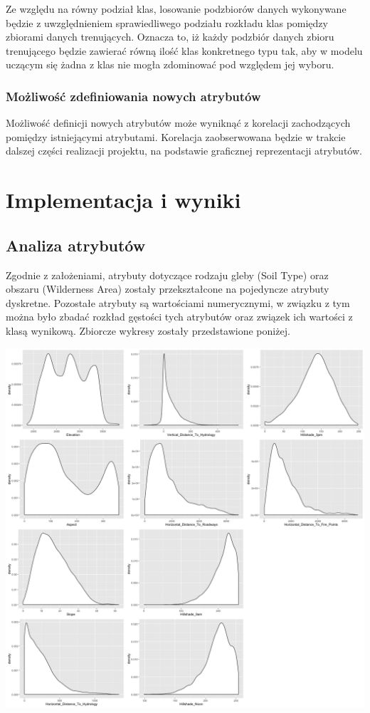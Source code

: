 \documentclass[11pt]{article} %
\begin{document}
Ze względu na równy podział klas, losowanie podzbiorów danych wykonywane będzie z uwzględnieniem sprawiedliwego podziału rozkładu klas pomiędzy zbiorami danych trenujących. Oznacza to, iż każdy podzbiór danych zbioru trenującego będzie zawierać równą ilość klas konkretnego typu tak, aby w modelu uczącym się żadna z klas nie mogła zdominować pod względem jej wyboru.

\subsubsection{Możliwość zdefiniowania nowych atrybutów}

Możliwość definicji nowych atrybutów może wyniknąć z korelacji zachodzących pomiędzy istniejącymi atrybutami. Korelacja zaobserwowana będzie w trakcie dalszej części realizacji projektu, na podstawie graficznej reprezentacji atrybutów.


\section{Implementacja i wyniki}

\subsection{Analiza atrybutów}

Zgodnie z założeniami, atrybuty dotyczące rodzaju gleby (Soil Type) oraz obszaru (Wilderness Area) zostały przekształcone na pojedyncze atrybuty dyskretne. Pozostałe atrybuty są wartościami numerycznymi, w związku z tym można było zbadać rozkład gęstości tych atrybutów oraz związek ich wartości z klasą wynikową. Zbiorcze wykresy zostały przedstawione poniżej.

\begin{center}
	\includegraphics[width=16cm]{density}
\end{center}
\end{document}
